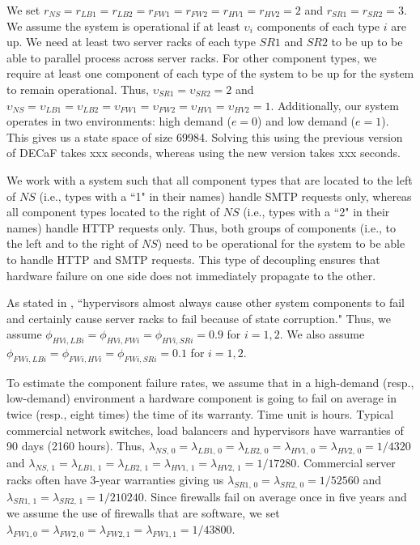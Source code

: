 \documentclass[12pt]{article}
\begin{document}
We set $r_{NS} = r_{LB1} = r_{LB2} = r_{FW1} = r_{FW2} = r_{HV1} = r_{HV2} =
2$ and $r_{SR1} = r_{SR2} = 3$. We assume the system is operational if at
least $\upsilon_i$ components of each type $i$ are up. We need at least two
server racks of each type $SR1$ and $SR2$ to be up to be able to parallel
process across server racks. For other component types, we require at least
one component of each type of the system to be up for the system to remain
operational. Thus, $\upsilon_{SR1} = \upsilon_{SR2} = 2$ and $\upsilon_{NS} =
\upsilon_{LB1} = \upsilon_{LB2} = \upsilon_{FW1} = \upsilon_{FW2} =
\upsilon_{HV1} = \upsilon_{HV2} = 1$. Additionally, our system operates in two
environments: high demand ($e = 0$) and low demand ($e = 1$). This gives us a
state space of size 69984. Solving this using the previous version of DECaF
takes xxx seconds, whereas using the new version takes xxx seconds.

We work with a system such that all component types that are located to the
left of $NS$ (i.e., types with a ``1" in their names) handle SMTP requests
only, whereas all component types located to the right of $NS$ (i.e., types
with a ``2" in their names) handle HTTP requests only. Thus, both groups of
components (i.e., to the left and to the right of $NS$) need to be operational
for the system to be able to handle HTTP and SMTP requests. This type of
decoupling ensures that hardware failure on one side does not immediately
propagate to the other.

As stated in \cite{ReHype:2011}, ``hypervisors almost always cause other
system components to fail and certainly cause server racks to fail because of
state corruption." Thus, we assume $\phi_{HVi,LBi} = \phi_{HVi,FWi} =
\phi_{HVi,SRi} = 0.9$ for $i = 1, 2$. We also assume $\phi_{FWi,LBi} = 
\phi_{FWi,HVi} = \phi_{FWi,SRi} = 0.1$ for $i = 1, 2$.

To estimate the component failure rates, we assume that in a high-demand
(resp., low-demand) environment a hardware component is going to fail
on average in twice (resp., eight times) the time of its warranty. Time unit
is hours. Typical commercial network switches, load balancers and hypervisors
have warranties of 90 days (2160 hours). Thus, $\lambda_{NS, \, 0} =
\lambda_{LB1, \, 0} = \lambda_{LB2, \, 0} = \lambda_{HV1, \, 0} =
\lambda_{HV2, \, 0} = 1 / 4320$ and $\lambda_{NS, \, 1} = \lambda_{LB1, \, 1}
= \lambda_{LB2, \, 1} = \lambda_{HV1, \, 1} = \lambda_{HV2, \, 1} = 1 /
17280$. Commercial server racks often have 3-year warranties giving us
$\lambda_{SR1,\, 0} = \lambda_{SR2, \, 0} = 1 / 52560$ and $\lambda_{SR1, \,
1} = \lambda_{SR2, \, 1} = 1 / 210240$. Since firewalls fail on average once
in five years and we assume the use of firewalls that are software, we set
$\lambda_{FW1, 0} = \lambda_{FW2, 0} = \lambda_{FW2, 1} = \lambda_{FW1, 1} = 1
/ 43800 $.
\end{document}
